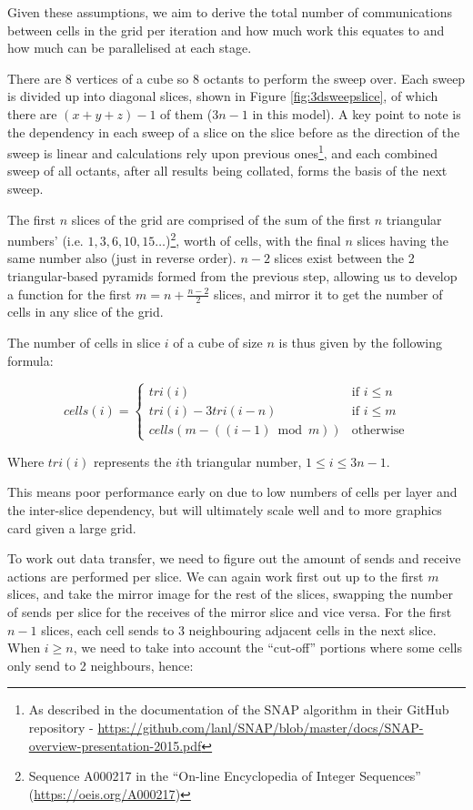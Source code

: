 \documentclass[conference]{IEEEtran}
\begin{document}
Given these assumptions, we aim to derive the total number of communications between cells in the grid per iteration and how much work this equates to and how much can be parallelised at each stage.

There are $ 8 $ vertices of a cube so $ 8 $ octants to perform the sweep over. Each sweep is divided up into diagonal slices, shown in Figure \ref{fig:3dsweepslice}, of which there are $ (x + y + z) - 1 $ of them ($ 3n - 1 $ in this model). A key point to note is the dependency in each sweep of a slice on the slice before as the direction of the sweep is linear and calculations rely upon previous ones\footnote{As described in the documentation of the SNAP algorithm in their GitHub repository - \url{ https://github.com/lanl/SNAP/blob/master/docs/SNAP-overview-presentation-2015.pdf}}, and each combined sweep of all octants, after all results being collated, forms the basis of the next sweep.

The first $ n $ slices of the grid are comprised of the sum of the first $ n $ triangular numbers’ (i.e. $ 1, 3, 6, 10, 15\dots $)\footnote{Sequence A000217 in the ``On-line Encyclopedia of Integer Sequences'' (\url{https://oeis.org/A000217})}, worth of cells, with the final $ n $ slices having the same number also (just in reverse order). $ n - 2 $ slices exist between the 2 triangular-based pyramids formed from the previous step, allowing us to develop a function for the first $ m = n + \frac{n - 2}{2} $ slices, and mirror it to get the number of cells in any slice of the grid.

The number of cells in slice $ i $ of a cube of size $ n $ is thus given by the following formula:

\begin{equation}
cells(i) = \left\{
	\begin{array}{ll}
		tri(i) & \mbox{if } i \le n \\
		tri(i) - 3tri(i - n) & \mbox{if } i \le m \\
		cells(m - ((i - 1)\bmod m)) & \mbox{otherwise}
	\end{array}
\right.
\end{equation}

Where $ tri(i) $ represents the $i$th triangular number, $ 1 \le i \le 3n - 1 $. 

This means poor performance early on due to low numbers of cells per layer and the inter-slice dependency, but will ultimately scale well and to more graphics card given a large grid.

To work out data transfer, we need to figure out the amount of sends and receive actions are performed per slice. We can again work first out up to the first $ m $ slices, and take the mirror image for the rest of the slices, swapping the number of sends per slice for the receives of the mirror slice and vice versa. For the first $ n - 1 $ slices, each cell sends to 3 neighbouring adjacent cells in the next slice. When $ i \ge n $, we need to take into account the ``cut-off'' portions where some cells only send to 2 neighbours, hence:
\end{document}
